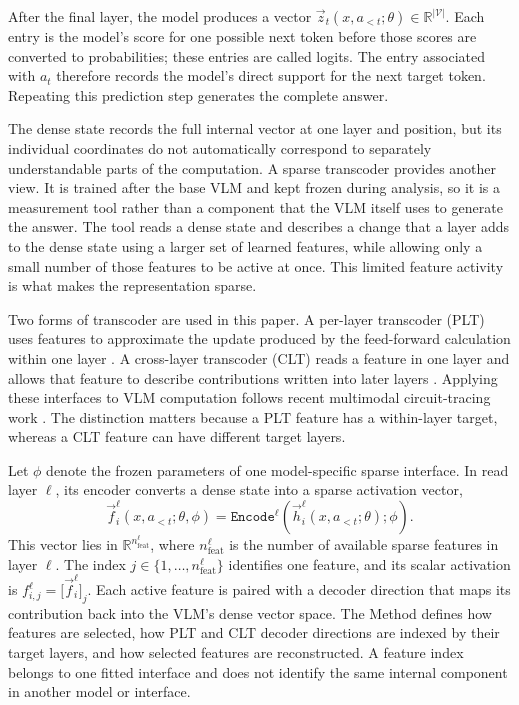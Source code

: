 After the final layer, the model produces a vector $\vec{z}_{t}(x,a_{<t};\theta)\in\mathbb{R}^{|\mathcal{V}|}$. Each entry is the model's score for one possible next token before those scores are converted to probabilities; these entries are called logits. The entry associated with $a_t$ therefore records the model's direct support for the next target token. Repeating this prediction step generates the complete answer.

The dense state records the full internal vector at one layer and position, but its individual coordinates do not automatically correspond to separately understandable parts of the computation. A sparse transcoder provides another view. It is trained after the base VLM and kept frozen during analysis, so it is a measurement tool rather than a component that the VLM itself uses to generate the answer. The tool reads a dense state and describes a change that a layer adds to the dense state using a larger set of learned features, while allowing only a small number of those features to be active at once. This limited feature activity is what makes the representation sparse.

Two forms of transcoder are used in this paper. A per-layer transcoder (PLT) uses features to approximate the update produced by the feed-forward calculation within one layer \citep{dunefsky2024transcoders}. A cross-layer transcoder (CLT) reads a feature in one layer and allows that feature to describe contributions written into later layers \citep{ameisen2025circuittracing}. Applying these interfaces to VLM computation follows recent multimodal circuit-tracing work \citep{yang2026vlmcircuittracing}. The distinction matters because a PLT feature has a within-layer target, whereas a CLT feature can have different target layers.

\begin{samepage}
Let $\phi$ denote the frozen parameters of one model-specific sparse interface. In read layer $\ell$, its encoder converts a dense state into a sparse activation vector,
\begin{equation}
    \vec{f}_{i}^{\ell}(x,a_{<t};\theta,\phi)
    =\mathtt{Encode}^{\ell}\!\left(\vec{h}_{i}^{\ell}(x,a_{<t};\theta);\phi\right).
    \label{eq:sparse-encoding}
\end{equation}
This vector lies in $\mathbb{R}^{n_{\mathrm{feat}}^{\ell}}$, where $n_{\mathrm{feat}}^{\ell}$ is the number of available sparse features in layer $\ell$. The index $j\in\{1,\ldots,n_{\mathrm{feat}}^{\ell}\}$ identifies one feature, and its scalar activation is $f_{i,j}^{\ell}=\bigl[\vec{f}_{i}^{\ell}\bigr]_{j}$. Each active feature is paired with a decoder direction that maps its contribution back into the VLM's dense vector space. The Method defines how features are selected, how PLT and CLT decoder directions are indexed by their target layers, and how selected features are reconstructed. A feature index belongs to one fitted interface and does not identify the same internal component in another model or interface.
\end{samepage}

